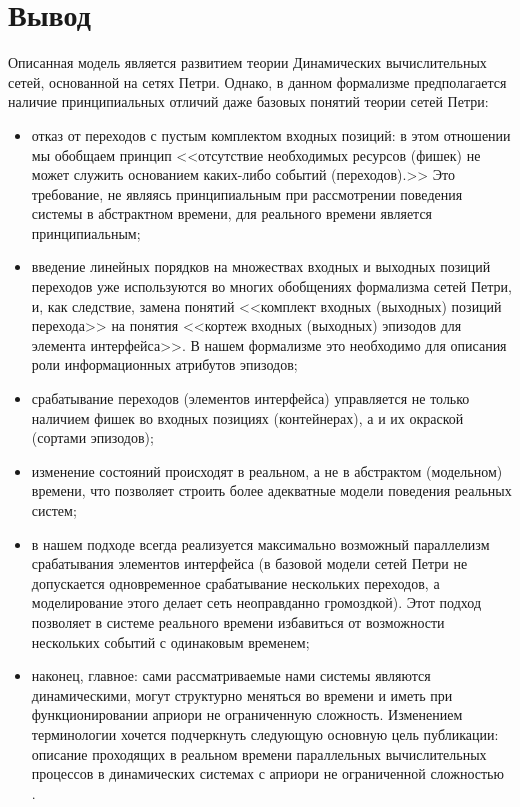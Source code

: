 \section{Вывод}
Описанная модель является развитием теории Динамических вычислительных сетей, основанной на сетях Петри. 
Однако, в данном формализме предполагается наличие принципиальных отличий даже базовых понятий теории сетей Петри: 
\begin{itemize}
	\item отказ от переходов с пустым комплектом входных позиций: в этом отношении мы обобщаем принцип <<отсутствие необходимых ресурсов (фишек) не может служить основанием каких-либо событий (переходов).>> Это требование, не являясь принципиальным при рассмотрении поведения системы в абстрактном времени, для реального времени является принципиальным;
	\item введение линейных порядков на множествах входных и выходных позиций переходов уже используются во многих обобщениях формализма сетей Петри, и, как следствие, замена понятий <<комплект входных (выходных) позиций перехода>> на понятия <<кортеж входных (выходных) эпизодов для элемента интерфейса>>. В  нашем формализме это необходимо для описания роли информационных атрибутов эпизодов;
	\item срабатывание переходов (элементов интерфейса) управляется не только наличием фишек во входных позициях (контейнерах), а и их окраской (сортами эпизодов);
	\item изменение состояний происходят в реальном, а не в абстрактом (модельном) времени, что позволяет строить более адекватные модели поведения реальных систем;
	\item в нашем подходе всегда реализуется максимально возможный параллелизм срабатывания элементов интерфейса (в базовой модели сетей Петри не допускается одновременное срабатывание нескольких переходов, а моделирование этого делает сеть неоправданно громоздкой). Этот подход позволяет в системе реального времени избавиться от возможности нескольких событий с одинаковым временем;
	\item наконец, главное: сами рассматриваемые нами системы являются динамическими, могут структурно меняться во времени и иметь при функционировании априори не ограниченную сложность.
Изменением терминологии хочется подчеркнуть следующую основную цель публикации: описание проходящих в реальном времени параллельных вычислительных процессов в динамических системах с априори не ограниченной сложностью \cite{Falk}.
\end{itemize}


